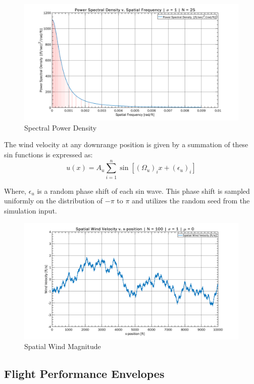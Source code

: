 \documentclass[10pt,a4paper]{article}
\begin{document}
\begin{figure}[h!]
	\centering
	\includegraphics[width=1\textwidth]{./figs/dryden.png}
	\caption{Spectral Power Density}
	\label{fig:dryden}
\end{figure}
The wind velocity at any downrange position is given by a summation of these sin functions is expressed as:
\begin{equation}
u(x) = A_u\sum _{i=1}^{n}\sin[(\Omega_u)_ix+(\epsilon_u)_i]
\label{eq:wind_vel}
\end{equation}


Where, $\epsilon_u$ is a random phase shift of each sin wave. This phase shift is sampled uniformly on the distribution of $-\pi$ to $\pi$ and utilizes the random seed from the simulation input. 
\begin{figure}[h!]
	\centering
	\includegraphics[width=1\textwidth]{./figs/wind.png}
	\caption{Spatial Wind Magnitude}
	\label{fig:wind}
\end{figure}

\subsection{Flight Performance Envelopes}
\end{document}
